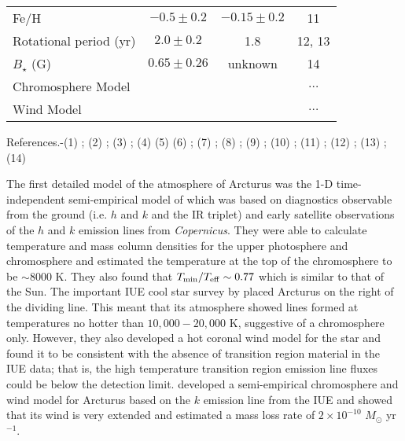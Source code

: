\begin{table}[!hb]
\begin{center}
\begin{tabular}{lccc}
Fe/H& $-0.5\pm0.2$ & $- 0.15 \pm 0.2$ & 11\\
Rotational period (yr) & $2.0 \pm 0.2$ & 1.8 & 12, 13\\
$B_{\star}$ (G) & $0.65 \pm 0.26$ & unknown & 14\\
Chromosphere Model & \cite{drake_1985} & \cite{mcmurry_1999}& $\ldots$\\
Wind Model & \cite{drake_1985}& \cite{robinson_1998}& $\ldots$\\
\hline
\end{tabular}
\label{tab:3.4}
\begin{minipage}{14.0cm}
References.-(1) \cite{perryman_1997}; (2) \cite{van_leeuwen_2007}; (3) \cite{kallinger_2010}; (4) \cite{lebzelter_2012}  (5) \cite{ramirez_2011} (6) \cite{richichi_2005}; (7) \cite{di_benedetto_1993}; (8) \cite{massarotti_2008}; (9) \cite{drake_1985}; (10) \cite{robinson_1998};  (11) \cite{decin_2003}; (12) \cite{gray_2006}; (13) \cite{hatzes_1993}; (14) \cite{sennhauser_2011}
\end{minipage}
\end{center}
\end{table}

The first detailed model of the atmosphere of Arcturus was the 1-D time-independent semi-empirical model of \cite{ayres_1975} which was based on diagnostics observable from the ground (i.e.  $h$ and $k$ and the  IR triplet) and early satellite observations of the  $h$ and $k$ emission lines from \textit{Copernicus}. They were able to calculate temperature and mass column densities for the upper photosphere and chromosphere and estimated the temperature at the top of the chromosphere to be $\sim 8000$ K. They also found that $T_{\rm{min}}/T_{\rm{eff}} \sim 0.77$ which is similar to that of the Sun. The important IUE cool star survey by \cite{linsky_1979} placed Arcturus on the right of the dividing line. This meant that its atmosphere showed lines formed at temperatures no hotter than $10,000 - 20,000$ K, suggestive of a chromosphere only. However, they also developed a hot coronal wind model for the star and found it to be consistent with the absence of transition region material in the IUE data; 	that is, the high temperature transition region emission line fluxes could be below the detection limit. \cite{drake_1985} developed a semi-empirical chromosphere and wind model for Arcturus based on the  $k$ emission line from the IUE and showed that its wind is very extended and estimated a mass loss rate of $2\times 10^{-10}$ $M_{\odot}$ yr$^{-1}$.


